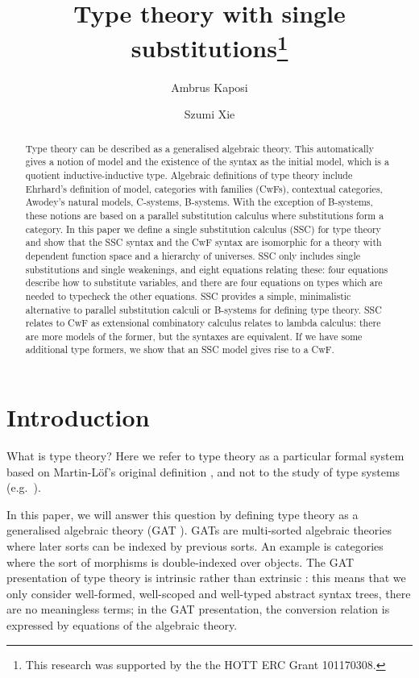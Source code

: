 \documentclass[submission,copyright,creativecommons]{eptcs}
\title{Type theory with single substitutions\thanks{This research was supported by the the HOTT ERC Grant 101170308.}}
\author{Ambrus Kaposi
\institute{Eötvös Loránd University (ELTE)\\
Budapest, Hungary}
\email{akaposi@inf.elte.hu}
\and
Szumi Xie
\institute{Eötvös Loránd University (ELTE)\\
Budapest, Hungary}
\email{szumi@inf.elte.hu}
}
\begin{document}
\maketitle

\begin{abstract}
Type theory can be described as a generalised algebraic theory. This
automatically gives a notion of model and the existence of the syntax
as the initial model, which is a quotient inductive-inductive
type. Algebraic definitions of type theory include Ehrhard's
definition of model, categories with families (CwFs), contextual
categories, Awodey's natural models, C-systems, B-systems. With the
exception of B-systems, these notions are based on a parallel
substitution calculus where substitutions form a category. In this
paper we define a single substitution calculus (SSC) for type theory
and show that the SSC syntax and the CwF syntax are isomorphic for a
theory with dependent function space and a hierarchy of universes. SSC
only includes single substitutions and single weakenings, and eight
equations relating these: four equations describe how to substitute
variables, and there are four equations on types which are needed to
typecheck the other equations. SSC provides a simple, minimalistic
alternative to parallel substitution calculi or B-systems for defining
type theory. SSC relates to CwF as extensional combinatory calculus
relates to lambda calculus: there are more models of the former, but
the syntaxes are equivalent. If we have some additional type formers,
we show that an SSC model gives rise to a CwF.
\end{abstract}

\section{Introduction}

What is type theory? Here we refer to type theory as a particular
formal system based on Martin-Löf's original definition
\cite{martinlof73predicative}, and not to the study of type systems
(e.g.\ \cite{DBLP:books/daglib/0005958}).

In this paper, we will answer this question by defining type theory as
a generalised algebraic theory (GAT
\cite{DBLP:journals/apal/Cartmell86}). GATs are multi-sorted algebraic
theories where later sorts can be indexed by previous sorts. An
example is categories where the sort of morphisms is double-indexed
over objects.
%
The GAT presentation of type theory is intrinsic
\cite{DBLP:conf/csl/AltenkirchR99,DBLP:conf/popl/AltenkirchK16} rather
than extrinsic
\cite{alti:phd93,abel2013normalization,DBLP:conf/cpp/AdjedjLMPP24}:
this means that we only consider well-formed, well-scoped and
well-typed abstract syntax trees, there are no meaningless terms; in
the GAT presentation, the conversion relation is expressed by
equations of the algebraic theory.
\end{document}
